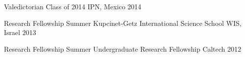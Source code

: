 \begin{cvhonors}

  \cvhonor
    {Valedictorian} %
    {Class of 2014} %
    {IPN, Mexico} %
    {2014} %

  \cvhonor
    {Research Fellowship}
    {Summer Kupcinet-Getz International Science School}
    {WIS, Israel} %
    {2013} %

  \cvhonor
    {Research Fellowship}
    {Summer Undergraduate Research Fellowship}
    {Caltech} %
    {2012} %





\end{cvhonors}
